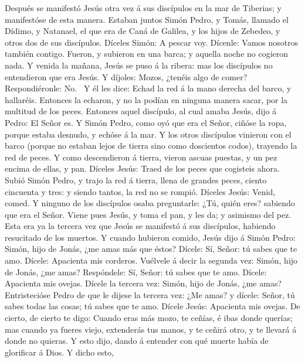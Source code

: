  Después se manifestó Jesús otra vez á sus discípulos en la
mar de Tiberias; y manifestóse de esta manera.  Estaban
juntos Simón Pedro, y Tomás, llamado el Dídimo, y Natanael, el que era
de Caná de Galilea, y los hijos de Zebedeo, y otros dos de sus
discípulos.  Díceles Simón: A pescar voy. Dícenle: Vamos
nosotros también contigo. Fueron, y subieron en una barca; y aquella
noche no cogieron nada.  Y venida la mañana, Jesús se puso á
la ribera: mas los discípulos no entendieron que era Jesús. 
Y díjoles: Mozos, ¿tenéis algo de comer? Respondiéronle:
No.~ Y él les dice: Echad la red á la mano derecha del
barco, y hallaréis. Entonces la echaron, y no la podían en ninguna
manera sacar, por la multitud de los peces.  Entonces aquel
discípulo, al cual amaba Jesús, dijo á Pedro: El Señor es. Y Simón
Pedro, como oyó que era el Señor, ciñóse la ropa, porque estaba desnudo,
y echóse á la mar.  Y los otros discípulos vinieron con el
barco (porque no estaban lejos de tierra sino como doscientos codos),
trayendo la red de peces.  Y como descendieron á tierra,
vieron ascuas puestas, y un pez encima de ellas, y pan. 
Díceles Jesús: Traed de los peces que cogisteis ahora. 
Subió Simón Pedro, y trajo la red á tierra, llena de grandes peces,
ciento cincuenta y tres: y siendo tantos, la red no se rompió.
 Díceles Jesús: Venid, comed. Y ninguno de los discípulos
osaba preguntarle: ¿Tú, quién eres? sabiendo que era el Señor.
 Viene pues Jesús, y toma el pan, y les da; y asimismo del
pez.  Esta era ya la tercera vez que Jesús se manifestó á
sus discípulos, habiendo resucitado de los muertos.  Y
cuando hubieron comido, Jesús dijo á Simón Pedro: Simón, hijo de Jonás,
¿me amas más que éstos? Dícele: Sí, Señor: tú sabes que te amo. Dícele:
Apacienta mis corderos.  Vuélvele á decir la segunda vez:
Simón, hijo de Jonás, ¿me amas? Respóndele: Sí, Señor: tú sabes que te
amo. Dícele: Apacienta mis ovejas.  Dícele la tercera vez:
Simón, hijo de Jonás, ¿me amas? Entristecióse Pedro de que le dijese la
tercera vez: ¿Me amas? y dícele: Señor, tú sabes todas las cosas; tú
sabes que te amo. Dícele Jesús: Apacienta mis ovejas.  De
cierto, de cierto te digo: Cuando eras más mozo, te ceñías, é ibas donde
querías; mas cuando ya fueres viejo, extenderás tus manos, y te ceñirá
otro, y te llevará á donde no quieras.  Y esto dijo, dando
á entender con qué muerte había de glorificar á Dios. Y dicho esto,
